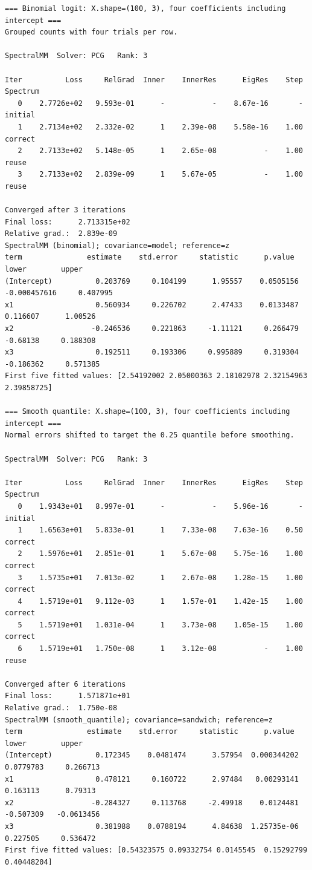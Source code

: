 \documentclass[11pt]{article}
\begin{document}
\begin{lstlisting}
=== Binomial logit: X.shape=(100, 3), four coefficients including intercept ===
Grouped counts with four trials per row.

SpectralMM  Solver: PCG   Rank: 3

Iter          Loss     RelGrad  Inner    InnerRes      EigRes    Step  Spectrum
   0    2.7726e+02   9.593e-01      -           -    8.67e-16       -  initial
   1    2.7134e+02   2.332e-02      1    2.39e-08    5.58e-16    1.00  correct
   2    2.7133e+02   5.148e-05      1    2.65e-08           -    1.00  reuse
   3    2.7133e+02   2.839e-09      1    5.67e-05           -    1.00  reuse

Converged after 3 iterations
Final loss:      2.713315e+02
Relative grad.:  2.839e-09
SpectralMM (binomial); covariance=model; reference=z
term               estimate    std.error     statistic      p.value        lower        upper
(Intercept)          0.203769     0.104199      1.95557    0.0505156 -0.000457616     0.407995
x1                   0.560934     0.226702      2.47433    0.0133487     0.116607      1.00526
x2                  -0.246536     0.221863     -1.11121     0.266479     -0.68138     0.188308
x3                   0.192511     0.193306     0.995889     0.319304    -0.186362     0.571385
First five fitted values: [2.54192002 2.05000363 2.18102978 2.32154963 2.39858725]

=== Smooth quantile: X.shape=(100, 3), four coefficients including intercept ===
Normal errors shifted to target the 0.25 quantile before smoothing.

SpectralMM  Solver: PCG   Rank: 3

Iter          Loss     RelGrad  Inner    InnerRes      EigRes    Step  Spectrum
   0    1.9343e+01   8.997e-01      -           -    5.96e-16       -  initial
   1    1.6563e+01   5.833e-01      1    7.33e-08    7.63e-16    0.50  correct
   2    1.5976e+01   2.851e-01      1    5.67e-08    5.75e-16    1.00  correct
   3    1.5735e+01   7.013e-02      1    2.67e-08    1.28e-15    1.00  correct
   4    1.5719e+01   9.112e-03      1    1.57e-01    1.42e-15    1.00  correct
   5    1.5719e+01   1.031e-04      1    3.73e-08    1.05e-15    1.00  correct
   6    1.5719e+01   1.750e-08      1    3.12e-08           -    1.00  reuse

Converged after 6 iterations
Final loss:      1.571871e+01
Relative grad.:  1.750e-08
SpectralMM (smooth_quantile); covariance=sandwich; reference=z
term               estimate    std.error     statistic      p.value        lower        upper
(Intercept)          0.172345    0.0481474      3.57954  0.000344202    0.0779783     0.266713
x1                   0.478121     0.160722      2.97484   0.00293141     0.163113      0.79313
x2                  -0.284327     0.113768     -2.49918    0.0124481    -0.507309   -0.0613456
x3                   0.381988    0.0788194      4.84638  1.25735e-06     0.227505     0.536472
First five fitted values: [0.54323575 0.09332754 0.0145545  0.15292799 0.40448204]


\end{lstlisting}
\end{document}
